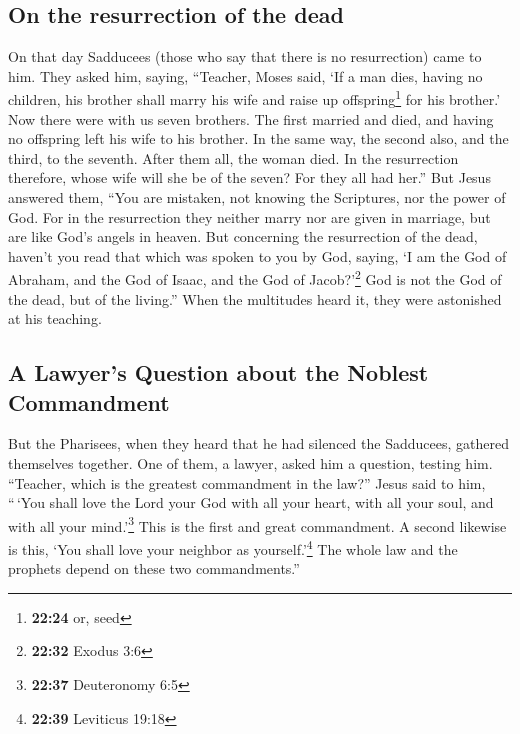 \hypertarget{on-the-resurrection-of-the-dead}{%
\subsection{On the resurrection of the
dead}\label{on-the-resurrection-of-the-dead}}

 On that day Sadducees (those who say that there is no
resurrection) came to him. They asked him,  saying,
``Teacher, Moses said, `If a man dies, having no children, his brother
shall marry his wife and raise up offspring\footnote{\textbf{22:24} or,
  seed} for his brother.'  Now there were with us seven
brothers. The first married and died, and having no offspring left his
wife to his brother.  In the same way, the second also,
and the third, to the seventh.  After them all, the woman
died.  In the resurrection therefore, whose wife will she
be of the seven? For they all had her.''  But Jesus
answered them, ``You are mistaken, not knowing the Scriptures, nor the
power of God.  For in the resurrection they neither marry
nor are given in marriage, but are like God's angels in heaven.
 But concerning the resurrection of the dead, haven't you
read that which was spoken to you by God, saying,  `I am
the God of Abraham, and the God of Isaac, and the God of
Jacob?'\footnote{\textbf{22:32} Exodus 3:6} God is not the God of the
dead, but of the living.''  When the multitudes heard it,
they were astonished at his teaching.

\hypertarget{a-lawyers-question-about-the-noblest-commandment}{%
\subsection{A Lawyer's Question about the Noblest
Commandment}\label{a-lawyers-question-about-the-noblest-commandment}}

 But the Pharisees, when they heard that he had silenced
the Sadducees, gathered themselves together.  One of
them, a lawyer, asked him a question, testing him. 
``Teacher, which is the greatest commandment in the law?''
 Jesus said to him, ``\,`You shall love the Lord your God
with all your heart, with all your soul, and with all your
mind.'\footnote{\textbf{22:37} Deuteronomy 6:5}  This is
the first and great commandment.  A second likewise is
this, `You shall love your neighbor as yourself.'\footnote{\textbf{22:39}
  Leviticus 19:18}  The whole law and the prophets depend
on these two commandments.''

